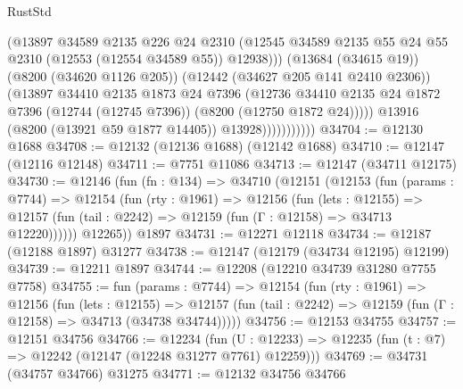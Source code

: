 \begin{lexlean}{RustStd}
\begin{coremodule}
                              (@13897
                                @34589
                                @2135
                                @226
                                @24
                                @2310
                                (@12545
                                  @34589
                                  @2135
                                  @55
                                  @24
                                  @55
                                  @2310
                                  (@12553 (@12554 @34589 @55))
                                  @12938)))
                            (@13684 (@34615 @19))
                            (@8200 (@34620 @1126 @205))
                            (@12442 (@34627 @205 @141 @2410 @2306))
                            (@13897
                              @34410
                              @2135
                              @1873
                              @24
                              @7396
                              (@12736
                                @34410
                                @2135
                                @24
                                @1872
                                @7396
                                (@12744 (@12745 @7396))
                                (@8200 (@12750 @1872 @24)))))
                          @13916
                          (@8200 (@13921 @59 @1877 @14405))
                          @13928)))))))))))
@34704 := @12130 @1688
@34708 := @12132 (@12136 @1688) (@12142 @1688)
@34710 := @12147 (@12116 @12148)
@34711 := @7751 @11086
@34713 := @12147 (@34711 @12175)
@34730 := @12146
    (fun (fn : @134) =>
    @34710
      (@12151
        (@12153
          (fun (params : @7744) =>
          @12154
            (fun (rty : @1961) =>
            @12156
              (fun (lets : @12155) =>
              @12157 (fun (tail : @2242) => @12159 (fun (Γ : @12158) => @34713 @12220))))))
        @12265))
    @1897
@34731 := @12271 @12118
@34734 := @12187 (@12188 @1897) @31277
@34738 := @12147 (@12179 (@34734 @12195) @12199)
@34739 := @12211 @1897
@34744 := @12208 (@12210 @34739 @31280 @7755 @7758)
@34755 := fun (params : @7744) =>
  @12154
    (fun (rty : @1961) =>
    @12156
      (fun (lets : @12155) =>
      @12157 (fun (tail : @2242) => @12159 (fun (Γ : @12158) => @34713 (@34738 @34744)))))
@34756 := @12153 @34755
@34757 := @12151 @34756
@34766 := @12234
    (fun (U : @12233) => @12235 (fun (t : @7) => @12242 (@12147 (@12248 @31277 @7761) @12259)))
@34769 := @34731 (@34757 @34766) @31275
@34771 := @12132 @34756 @34766

\end{coremodule}
\end{lexlean}
